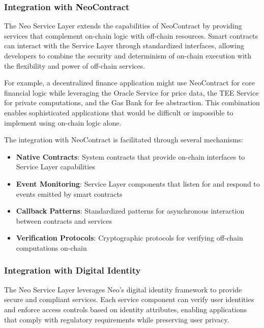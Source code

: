 \documentclass{article}
\begin{document}


\subsubsection{Integration with NeoContract}
\label{subsubsec:neocontract-integration}

The Neo Service Layer extends the capabilities of NeoContract by providing services that complement on-chain logic with off-chain resources. Smart contracts can interact with the Service Layer through standardized interfaces, allowing developers to combine the security and determinism of on-chain execution with the flexibility and power of off-chain services.

For example, a decentralized finance application might use NeoContract for core financial logic while leveraging the Oracle Service for price data, the TEE Service for private computations, and the Gas Bank for fee abstraction. This combination enables sophisticated applications that would be difficult or impossible to implement using on-chain logic alone.

The integration with NeoContract is facilitated through several mechanisms:

\begin{itemize}
    \item \textbf{Native Contracts}: System contracts that provide on-chain interfaces to Service Layer capabilities
    \item \textbf{Event Monitoring}: Service Layer components that listen for and respond to events emitted by smart contracts
    \item \textbf{Callback Patterns}: Standardized patterns for asynchronous interaction between contracts and services
    \item \textbf{Verification Protocols}: Cryptographic protocols for verifying off-chain computations on-chain
\end{itemize}

\subsubsection{Integration with Digital Identity}
\label{subsubsec:identity-integration}

The Neo Service Layer leverages Neo's digital identity framework to provide secure and compliant services. Each service component can verify user identities and enforce access controls based on identity attributes, enabling applications that comply with regulatory requirements while preserving user privacy.
\end{document}
